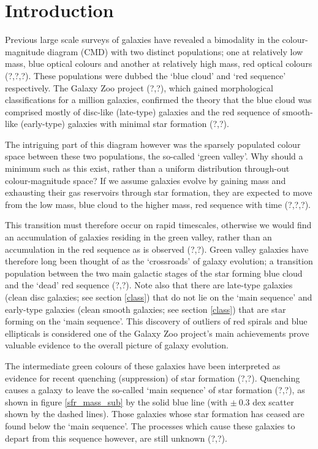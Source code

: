 \documentclass{mn2e}
\begin{document}
\section{Introduction}
Previous large scale surveys of galaxies have revealed a bimodality in the colour-magnitude diagram (CMD) with two distinct populations; one at relatively low mass, blue optical colours and another at relatively high mass, red optical colours (?,?,?). These populations were dubbed the `blue cloud' and `red sequence' respectively. The Galaxy Zoo project (?,?), which gained morphological classifications for a million galaxies, confirmed the theory that the blue cloud was comprised mostly of disc-like (late-type) galaxies and the red sequence of smooth-like (early-type) galaxies with minimal star formation (?,?). 

The intriguing part of this diagram however was the sparsely populated colour space between these two populations, the so-called `green valley'. Why should a minimum such as this exist, rather than a uniform distribution through-out colour-magnitude space? If we assume galaxies evolve by gaining mass and exhausting their gas reservoirs through star formation, they are expected to move from the low mass, blue cloud to the higher mass, red sequence with time (?,?,?). 

This transition must therefore occur on rapid timescales, otherwise we would find an accumulation of galaxies residing in the green valley, rather than an accumulation in the red sequence as is observed (?,?). Green valley galaxies have therefore long been thought of as the `crossroads' of galaxy evolution; a transition population between the two main galactic stages of the star forming blue cloud and the `dead' red sequence (?,?). Note also that there are late-type galaxies (clean disc galaxies; see section \ref{class}) that do not lie on the `main sequence' and early-type galaxies (clean smooth galaxies; see section \ref{class}) that are star forming on the `main sequence'. This discovery of outliers of red spirals and blue ellipticals is considered one of the Galaxy Zoo project's main achievements prove valuable evidence to the overall picture of galaxy evolution. 

The intermediate green colours of these galaxies have been interpreted as evidence for recent quenching (suppression) of star formation (?,?). Quenching causes a galaxy to leave the so-called `main sequence' of star formation (?,?), as shown in figure \ref{sfr_mass_sub} by the solid blue line (with $\pm ~0.3$ dex scatter shown by the dashed lines). Those galaxies whose star formation has ceased are found below the `main sequence'. The processes which cause these galaxies to depart from this sequence however, are still unknown (?,?).
\end{document}
